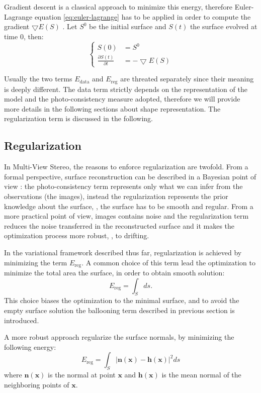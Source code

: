 Gradient descent is a classical approach to minimize this energy, therefore Euler-Lagrange equation \eqref{eq:euler-lagrange} has to be applied in order to compute the gradient $\bigtriangledown E(\mathit{S})$ \cite{hermosillo2002variational}. Let $\mathit{S}^0$ be the initial surface and $\mathit{S}(t)$ the surface evolved at time $0$, then:
\begin{equation}
 \begin{cases}
  \mathit{S}(0) &=\mathit{S}^0\\
  \frac{\partial \mathit{S}(t)}{\partial t} & = -\bigtriangledown E(\mathit{S})
 \end{cases}
\end{equation}

Usually the two terms $E_{\text{data}}$ and $E_{\text{reg}}$ are threated separately since their meaning is deeply different.
The data term strictly depends on the representation of the model and the photo-consistency measure adopted, therefore we will provide more details in the following sections about shape representation. 
The regularization term is discussed in the following.
\subsection{Regularization}
In Multi-View Stereo, the reasons to enforce regularization are twofold. From a formal perspective, surface reconstruction can be described in a Bayesian point of view \cite[p. 11]{delaunoy2011modelisation}: the photo-consistency term represents only what we can infer from the observations (the images), instead the regularization represents the prior knowledge about the surface, \ie, the surface has to be smooth and regular. 
From a more practical point of view, images contains noise and the regularization term reduces the noise transferred in the reconstructed surface and it makes the optimization process more robust, \eg, to drifting.

In the variational framework described thus far, regularization is achieved by minimizing the term $E_{\text{reg}}$. 
A common choice of this term lead the optimization to minimize the total area the surface, in order to obtain smooth solution:
\[
E_{\text{reg}} = \int_{\mathit{S}} ds.
\]
This choice biases the optimization to the minimal surface, and to avoid the empty surface solution the ballooning term described in previous section is introduced.

A more robust approach regularize the surface normals, by minimizing the following energy:
\[
E_{\text{reg}} = \int_{\mathit{S}} |\mathbf{n}(\mathbf{x}) - \mathbf{h}(\mathbf{x})|^2 ds
\]
where $\mathbf{n}(\mathbf{x})$ is the normal at point $\mathbf{x}$ and $\mathbf{h}(\mathbf{x})$ is the mean normal of the neighboring points of $\mathbf{x}$.

